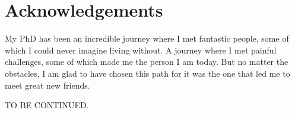 
\chapter*{Acknowledgements}
My PhD has been an incredible journey where I met fantastic people, some of which I could never imagine living without. A journey where I met painful challenges, some of which made me the person I am today. But no matter the obstacles, I am glad to have chosen this path for it was the one that led me to meet great new friends.

TO BE CONTINUED.

%
%
%
%
%
%
%
